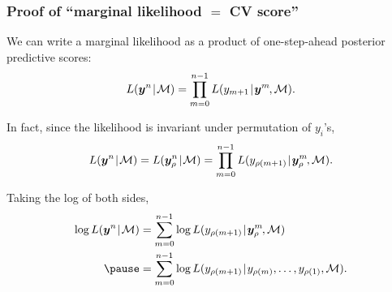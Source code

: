 \documentclass[18pt]{beamer}
\newcommand{\defineTightSpacing}{%
	\setlength{\abovedisplayskip}{.25\baselineskip}%
	\setlength{\belowdisplayskip}{.25\baselineskip}%
}
\renewcommand{\textsc}[1]{{\small \MakeUppercase{#1}}}
\newcommand{\given}{\thinnerspace | \thinnerspace}
\newcommand{\thinnerspace}{\mskip.5\thinmuskip}
\newcommand{\negthinnerspace}{\mskip-.5\thinmuskip}
\newcommand{\likelihood}{L}
\newcommand{\by}{\bm{y}}
\newcommand{\loss}{\mathcal{L}}
\newcommand{\modelSymbol}{\mathcal{M}}
\newcommand{\permutation}{\rho}
\newcommand{\trainingSize}{m}
\newcommand{\testSampleIndex}{i}
\newcommand{\testOutcome}{y_{\permutation(\testSampleIndex)}} %
\newcommand{\testOutcomePredicted}{\widehat{y}_{\permutation(\testSampleIndex)}^{\, \trainingSize}}
\begin{document}
\begin{frame}
\frametitle{Proof of ``marginal likelihood $=$ {\large CV} score''}
We can write a marginal likelihood as a product of one-step-ahead posterior predictive scores:
\vspace*{-.3\baselineskip}
\begin{equation*} \defineTightSpacing%
\likelihood(\by^n \given \modelSymbol)
	= \prod_{\trainingSize = 0}^{n - 1} \likelihood(y_{\trainingSize + 1} \given \by^\trainingSize\negthinnerspace, \modelSymbol).
\end{equation*}

\pause
In fact, since the likelihood is invariant under permutation of $y_i$'s,
\vspace*{-.15\baselineskip}
\begin{equation*} \defineTightSpacing%
\likelihood(\by^n \given \modelSymbol)
	= \likelihood(\by_{\permutation}^n \given \modelSymbol)
	= \prod_{\trainingSize = 0}^{n - 1} \likelihood(y_{\permutation(\trainingSize + 1)} \given \by_\permutation^\trainingSize\negthinnerspace, \modelSymbol).
\end{equation*}

\pause
Taking the log of both sides, 
\begin{equation*} \defineTightSpacing%
\begin{aligned}
\log \likelihood(\by^n \given \modelSymbol)
	&= \sum_{\trainingSize = 0}^{n - 1} \log \likelihood(y_{\permutation(\trainingSize + 1)} \given \by_\permutation^\trainingSize\negthinnerspace, \modelSymbol) \\
	\pause
	&= \sum_{\trainingSize = 0}^{n - 1} \log \likelihood(y_{\permutation(\trainingSize + 1)} \given y_{\permutation(\trainingSize)}, \ldots, y_{\permutation(1)}, \modelSymbol).
\end{aligned}
\end{equation*}

\end{frame}
\end{document}

